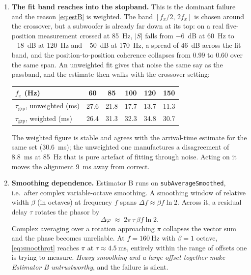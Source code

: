 \documentclass[11pt,a4paper]{article}
\newcommand{\code}[1]{\texttt{\small #1}}
\begin{document}
\begin{enumerate}[leftmargin=*]
\item \textbf{The fit band reaches into the stopband.} This is the dominant
  failure and the reason \eqref{eq:estB} is weighted. The band
  $[f_x/2,\,2f_x]$ is chosen around the crossover, but a subwoofer is already
  far down at its top: on a real five-position measurement crossed at
  \SI{85}{\hertz}, $|S|$ falls from \SI{-6}{\dB} at \SI{60}{\hertz} to
  \SI{-18}{\dB} at \SI{120}{\hertz} and \SI{-50}{\dB} at \SI{170}{\hertz}, a
  spread of \SI{46}{\dB} across the fit band, and the position-to-position
  coherence collapses from $0.99$ to $0.60$ over the same span. An unweighted
  fit gives that noise the same say as the passband, and the estimate then
  walks with the crossover setting:
  \begin{center}
  \begin{tabular}{@{}lccccc@{}}
  \toprule
  $f_x$ (Hz) & 60 & 85 & 100 & 120 & 150\\
  \midrule
  $\tau_{\mathrm{grp}}$, unweighted (ms) & 27.6 & 21.8 & 17.7 & 13.7 & 11.3\\
  $\tau_{\mathrm{grp}}$, weighted (ms)   & 26.4 & 31.3 & 32.3 & 34.8 & 30.7\\
  \bottomrule
  \end{tabular}
  \end{center}
  The weighted figure is stable and agrees with the arrival-time estimate for
  the same set (\SI{30.6}{\milli\second}); the unweighted one manufactures a
  disagreement of \SI{8.8}{\milli\second} at \SI{85}{\hertz} that is pure
  artefact of fitting through noise. Acting on it moves the alignment
  \SI{9}{\milli\second} away from correct.

\item \textbf{Smoothing dependence.} Estimator B runs on
  \code{subAverageSmoothed}, i.e.\ after complex variable-octave smoothing. A
  smoothing window of relative width $\beta$ (in octaves) at frequency $f$ spans
  $\Delta f \approx \beta f \ln 2$. Across it, a residual delay $\tau$ rotates
  the phasor by
  \begin{equation}
    \Delta\varphi \;\approx\; 2\pi\,\tau\,\beta f \ln 2 .
    \label{eq:smoothrot}
  \end{equation}
  Complex averaging over a rotation approaching $\pi$ collapses the vector sum
  and the phase becomes unreliable. At $f = \SI{160}{\hertz}$ with
  $\beta = 1$ octave, \eqref{eq:smoothrot} reaches $\pi$ at
  $\tau \approx \SI{4.5}{\milli\second}$, entirely within the range of
  offsets one is trying to measure. \emph{Heavy smoothing and a large offset
  together make Estimator B untrustworthy}, and the failure is silent.


\end{enumerate}
\end{document}
